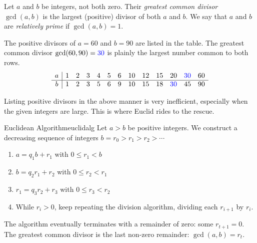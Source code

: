 \begin{defn}{}{}
	Let $a$ and $b$ be integers, not both zero. Their \emph{greatest common divisor} $\gcd(a,b)$ is the largest (positive) divisor of both $a$ and $b$. We say that $a$ and $b$ are \emph{relatively prime} if $\gcd(a,b)=1$.
\end{defn}

\begin{example}{}{}
	The positive divisors of $a=60$ and $b=90$ are listed in the table. The greatest common divisor $\gcd(60,90)=\textcolor{blue}{30}$ is plainly the largest number common to both rows.
	\[
		\begin{array}{c|cccccccccccc}
			a&1&2&3&4&5&6&10&12&15&20&\textcolor{blue}{30}&60\\\hline
			b&1&2&3&5&6&9&10&15&18&\textcolor{blue}{30}&45&90
		\end{array}
	\]
\end{example}

Listing positive divisors in the above manner is very inefficient, especially when the given integers are large. This is where Euclid rides to the rescue.

\begin{thm}{Euclidean Algorithm}{euclidalg}
	Let $a>b$ be positive integers. We construct a decreasing sequence of integers $b=r_0>r_1>r_2>\cdots$
	\begin{enumerate}\itemsep2pt
		\item {}$a=q_1b+r_1$ with $0\le r_1<b$
		\item {}$b=q_2r_1+r_2$ with $0\le r_2<r_1$
		\item {}$r_1=q_3r_2+r_3$ with $0\le r_3<r_2$
		\item While $r_i>0$, keep repeating the division algorithm, dividing each $r_{i+1}$ by $r_i$.
	\end{enumerate}
	The algorithm eventually terminates with a remainder of zero: some $r_{t+1}=0$. The greatest common divisor is the last non-zero remainder: $\gcd(a,b)=r_t$.
\end{thm}


